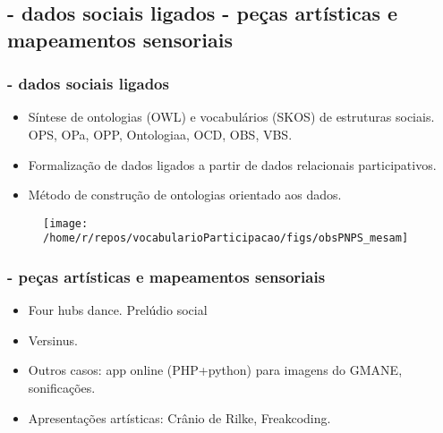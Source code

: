 \documentclass[10pt]{beamer}
\begin{document}
\begin{frame}
\subsection{- dados sociais ligados \;\; - peças artísticas e mapeamentos sensoriais}
\frametitle{- dados sociais ligados}
\begin{itemize}
	\item Síntese de ontologias (OWL) e vocabulários (SKOS) de estruturas sociais. OPS, OPa, OPP, Ontologiaa, OCD, OBS, VBS.
	\item Formalização de dados ligados a partir de dados relacionais participativos.
	\item Método de construção de ontologias orientado aos dados.
\end{itemize}

\begin{figure}[h!]
    \centering
    \texttt{[image: /home/r/repos/vocabularioParticipacao/figs/obsPNPS\_mesam]}
\end{figure}


\end{frame}

\begin{frame}
\frametitle{- peças artísticas e mapeamentos sensoriais}
\begin{itemize}
	\item Four hubs dance. Prelúdio social
	\item Versinus.
	\item Outros casos: app online (PHP+python) para imagens do GMANE, sonificações.
	\item Apresentações artísticas: Crânio de Rilke, Freakcoding.
\end{itemize}
\end{frame}
\end{document}
